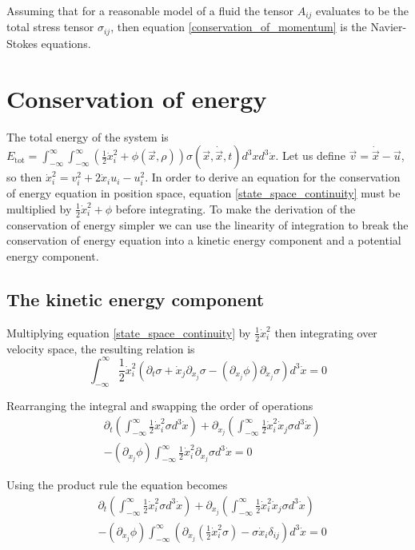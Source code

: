 \documentclass[%
 reprint,
 amsmath,amssymb,
 aps,
]{revtex4-1}
\newcommand{\dvec}[1]{\dot{\vec{#1}}}
\newcommand{\intVdot}[1]{\int_{-\infty}^{\infty} #1 d^3\dot{x}}
\newcommand{\intVVdot}[1]{\int_{-\infty}^{\infty}\int_{-\infty}^{\infty} #1 d^3xd^3\dot{x}}
\begin{document}
Assuming that for a reasonable model of a fluid the tensor $A_{ij}$ evaluates to be the total stress tensor $\sigma_{ij}$, then equation \eqref{conservation_of_momentum} is the Navier-Stokes equations.

\section{Conservation of energy}
The total energy of the system is $E_{\text{tot}}=\intVVdot{\left(\frac{1}{2}\dot{x}_i^2 + \phi(\vec{x}, \rho)\right)\sigma(\vec{x}, \dvec{x}, t)}$. Let us define $\vec{v} = \dvec{x} - \vec{u}$, so then $\dot{x}_i^2 = v_i^2 + 2\dot{x}_i u_i - u_i^2$. In order to derive an equation for the conservation of energy equation in position space, equation \eqref{state_space_continuity} must be multiplied by $\frac{1}{2}\dot{x}_i^2 + \phi$ before integrating. To make the derivation of the conservation of energy simpler we can use the linearity of integration to break the conservation of energy equation into a kinetic energy component and a potential energy component.

\subsection{The kinetic energy component}
Multiplying equation \eqref{state_space_continuity} by $\frac{1}{2}\dot{x}_i^2$ then integrating over velocity space, the resulting relation is
\[
\intVdot{\frac{1}{2}\dot{x}_i^2\left(\partial_t \sigma + \dot{x}_j\partial_{x_j}\sigma-\left(\partial_{x_j}\phi\right)\partial_{\dot{x}_j}\sigma\right)}=0
\]

Rearranging the integral and swapping the order of operations
\[
\begin{split}
& \partial_t\left(\intVdot{\frac{1}{2}\dot{x}_i^2\sigma}\right) + \partial_{x_j}\left(\intVdot{\frac{1}{2}\dot{x}_i^2\dot{x}_j\sigma}\right) \\ & - \left(\partial_{x_j}\phi\right)\intVdot{\frac{1}{2}\dot{x}_i^2\partial_{\dot{x}_j}\sigma}=0
\end{split}
\]

Using the product rule the equation becomes
\[
\begin{split}
& \partial_t\left(\intVdot{\frac{1}{2}\dot{x}_i^2\sigma}\right) + \partial_{x_j}\left(\intVdot{\frac{1}{2}\dot{x}_i^2\dot{x}_j\sigma}\right) \\ & - \left(\partial_{x_j}\phi\right)\intVdot{\left(\partial_{\dot{x}_j}\left(\frac{1}{2}\dot{x}_i^2\sigma\right) - \sigma\dot{x}_i\delta_{ij}\right)}=0
\end{split}
\]
\end{document}
